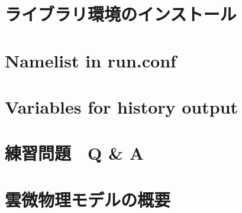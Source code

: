 \documentclass[a4paper]{jreport}
\begin{document}
\begin{appendix}

\chapter{ライブラリ環境のインストール} \label{sec:env_setting}

\chapter{Namelist in run.conf} \label{app:namelist}

\chapter{Variables for history output} \label{app:vari_hist}

\chapter{練習問題　Q \& A} \label{chap:practice}


\chapter{雲微物理モデルの概要} \label{chap:overview_microphysics}

\end{appendix}

\ClearWallPaper

\end{document}
